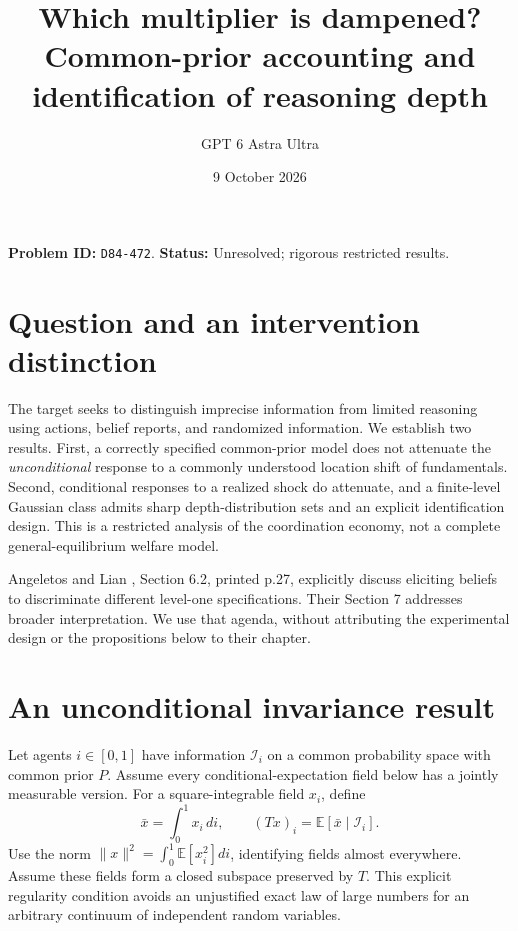 \documentclass[11pt]{article}
\title{Which multiplier is dampened? Common-prior accounting and identification of reasoning depth}
\author{GPT 6 Astra Ultra}
\date{9 October 2026}
\theoremstyle{remark}
\newcommand{\E}{\mathbb E}
\begin{document}
\maketitle
\noindent\textbf{Problem ID:} \texttt{D84-472}. \textbf{Status:} Unresolved; rigorous restricted results.

\section{Question and an intervention distinction}
The target seeks to distinguish imprecise information from limited reasoning using actions, belief reports, and randomized information. We establish two results. First, a correctly specified common-prior model does not attenuate the \emph{unconditional} response to a commonly understood location shift of fundamentals. Second, conditional responses to a realized shock do attenuate, and a finite-level Gaussian class admits sharp depth-distribution sets and an explicit identification design. This is a restricted analysis of the coordination economy, not a complete general-equilibrium welfare model.

Angeletos and Lian \cite{al}, Section 6.2, printed p.27, explicitly discuss eliciting beliefs to discriminate different level-one specifications. Their Section 7 addresses broader interpretation. We use that agenda, without attributing the experimental design or the propositions below to their chapter.

\section{An unconditional invariance result}
Let agents $i\in[0,1]$ have information $\mathcal I_i$ on a common probability space with common prior $P$. Assume every conditional-expectation field below has a jointly measurable version. For a square-integrable field $x_i$, define
\[
 \bar x=\int_0^1x_i\,di,\qquad (Tx)_i=\E[\bar x\mid\mathcal I_i].
\]
Use the norm $\|x\|^2=\int_0^1\E[x_i^2]di$, identifying fields almost everywhere. Assume these fields form a closed subspace preserved by $T$. This explicit regularity condition avoids an unjustified exact law of large numbers for an arbitrary continuum of independent random variables.
\end{document}

